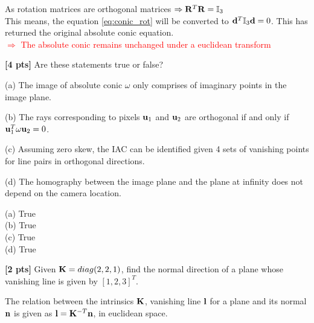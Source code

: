 \documentclass[11pt,addpoints,answers]{exam}
\numberwithin{equation}{section} %
\numberwithin{figure}{section} %
\numberwithin{table}{section} %
\begin{document}
\begin{questions}
\begin{tcolorbox}[fit,height=5cm, width=\textwidth, blank, borderline={0.5pt}{-2pt},halign=left, valign=center, nobeforeafter]
As rotation matrices are orthogonal matrices $\Rightarrow \mathbf{R}^T\mathbf{R} = \mathbb{I}_3 $\\
This means, the equation \ref{eq:conic_rot} will be converted to $\mathbf{d}^T \mathbb{I}_3 \mathbf{d}=0$. This has returned the original absolute conic equation.\\
\textcolor{red}{$\Rightarrow$ The absolute conic remains unchanged under a euclidean transform}

\end{tcolorbox}

\question \textbf{[4 pts]} Are these statements true or false?

(a) The image of absolute conic $\omega$ only comprises of imaginary points in the image plane.

(b) The rays corresponding to pixels $\mathbf{u}_1$ and $\mathbf{u}_2$ are orthogonal if and only if $\mathbf{u}_1^T \omega \mathbf{u}_2 = 0$.

(c) Assuming zero skew, the IAC can be identified given 4 sets of vanishing points for line pairs in orthogonal directions.

(d) The homography between the image plane and the plane at infinity does not depend on the camera location.

\begin{tcolorbox}[fit,height=5cm, width=\textwidth, blank, borderline={0.5pt}{-2pt},halign=left, valign=center, nobeforeafter]

(a) True\\
(b) True\\
(c) True\\
(d) True

\end{tcolorbox}

\question \textbf{[2 pts]} Given $\mathbf{K}=diag(2,2,1)$, find the normal direction of a plane whose vanishing line is given by $[1,2,3]^T$.

\begin{tcolorbox}[fit,height=5cm, width=\textwidth, blank, borderline={0.5pt}{-2pt},halign=left, valign=center, nobeforeafter]
The relation between the intrinsics $\mathbf{K}$, vanishing line $\mathbf{l}$ for a plane and its normal $\mathbf{n}$ is given as $\mathbf{l} = \mathbf{K}^{-T} \mathbf{n}$, in euclidean space.\\


\end{tcolorbox}
\end{questions}
\end{document}
